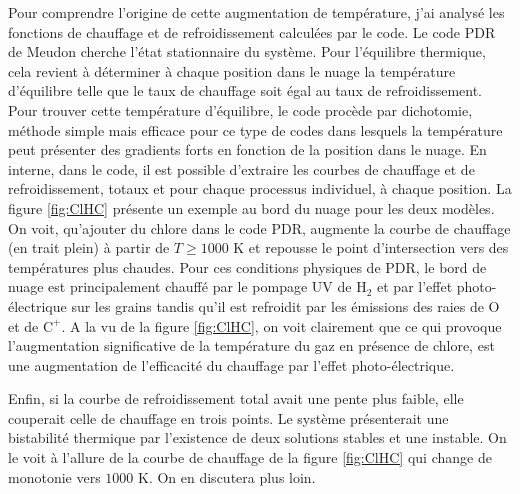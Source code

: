 Pour comprendre l'origine de cette augmentation de température, j'ai analysé les fonctions de chauffage et de refroidissement calculées par le code. Le code PDR de Meudon cherche l'état stationnaire du système. Pour l'équilibre thermique, cela revient à déterminer à chaque position dans le nuage la température d'équilibre telle que le taux de chauffage soit égal au taux de refroidissement. Pour trouver cette température d'équilibre, le code procède par dichotomie, méthode simple mais efficace pour ce type de codes dans lesquels la température peut présenter des gradients forts en fonction de la position dans le nuage. En interne, dans le code, il est possible d'extraire les courbes de chauffage et de refroidissement, totaux et pour chaque processus individuel, à chaque position. La figure \ref{fig:ClHC} présente un exemple au bord du nuage pour les deux modèles. 
On voit, qu'ajouter du chlore dans le code PDR, augmente la courbe de chauffage (en trait plein) à partir de $T\geq 1000$ K et repousse le point d'intersection vers des températures plus chaudes. Pour ces conditions physiques de PDR, le bord de nuage est principalement chauffé par le pompage UV de $\mathrm{H}_2$ et par l'effet photo-électrique sur les grains tandis qu'il est refroidit par les émissions des raies de $\mathrm{O}$ et de $\mathrm{C}^+$. A la vu de la figure \ref{fig:ClHC}, on voit clairement que ce qui provoque l'augmentation significative de la température du gaz en présence de chlore, est une augmentation de l'efficacité du chauffage par l'effet photo-électrique. \newline 

Enfin, si la courbe de refroidissement total avait une pente plus faible, elle couperait celle de chauffage en trois points. Le système présenterait une bistabilité thermique par l'existence de deux solutions stables et une instable. On le voit à l'allure de la courbe de chauffage de la figure \ref{fig:ClHC} qui change de monotonie vers $1000$ K. On en discutera plus loin.


